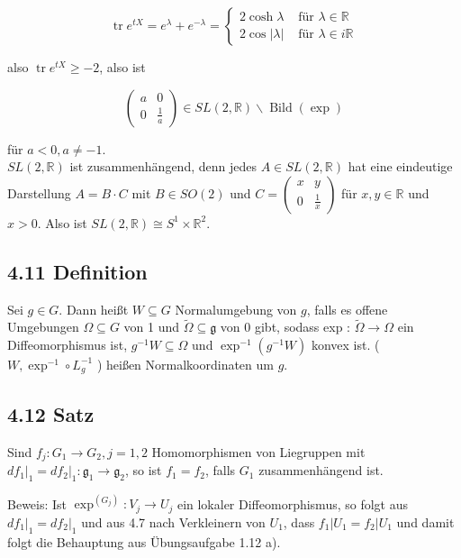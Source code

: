 \documentclass[10pt, letterpaper]{article}
\begin{document}
$$
\operatorname{tr} e^{t X}=e^{\lambda}+e^{-\lambda}= \begin{cases}2 \cosh \lambda & \text { für } \lambda \in \mathbb{R} \\ 2 \cos |\lambda| & \text { für } \lambda \in i \mathbb{R}\end{cases}
$$

also $\operatorname{tr} e^{t X} \geq-2$, also ist

$$
\left(\begin{array}{cc}
a & 0 \\
0 & \frac{1}{a}
\end{array}\right) \in S L(2, \mathbb{R}) \backslash \operatorname{Bild}(\exp )
$$

für $a<0, a \neq-1$.\\
$S L(2, \mathbb{R})$ ist zusammenhängend, denn jedes $A \in S L(2, \mathbb{R})$ hat eine eindeutige Darstellung $A=B \cdot C$ mit $B \in S O(2)$ und $C=\left(\begin{array}{cc}x & y \\ 0 & \frac{1}{x}\end{array}\right)$ für $x, y \in \mathbb{R}$ und $x>0$. Also ist $S L(2, \mathbb{R}) \cong S^{1} \times \mathbb{R}^{2}$.

\subsection*{4.11 Definition}
Sei $g \in G$. Dann heißt $W \subseteq G$ Normalumgebung von $g$, falls es offene Umgebungen $\Omega \subseteq G$ von 1 und $\tilde{\Omega} \subseteq \mathfrak{g}$ von 0 gibt, sodass exp : $\tilde{\Omega} \rightarrow \Omega$ ein Diffeomorphismus ist, $g^{-1} W \subseteq \Omega$ und $\exp ^{-1}\left(g^{-1} W\right)$ konvex ist. ( $W, \exp ^{-1} \circ L_{g}^{-1}$ ) heißen Normalkoordinaten um $g$.

\subsection*{4.12 Satz}
Sind $f_{j}: G_{1} \rightarrow G_{2}, j=1,2$ Homomorphismen von Liegruppen mit $\left.d f_{1}\right|_{1}=\left.d f_{2}\right|_{1}: \mathfrak{g}_{1} \rightarrow \mathfrak{g}_{2}$, so ist $f_{1}=f_{2}$, falls $G_{1}$ zusammenhängend ist.

Beweis: Ist $\exp ^{\left(G_{j}\right)}: V_{j} \rightarrow U_{j}$ ein lokaler Diffeomorphismus, so folgt aus $\left.d f_{1}\right|_{1}=\left.d f_{2}\right|_{1}$ und aus 4.7 nach Verkleinern von $U_{1}$, dass $f_{1}\left|U_{1}=f_{2}\right| U_{1}$ und damit folgt die Behauptung aus Übungsaufgabe 1.12 a).
\end{document}
